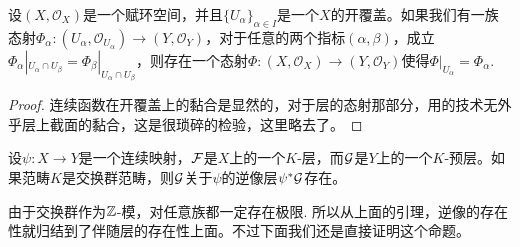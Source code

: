 \begin{pro}
设$(X,\mathcal{O}_X)$是一个赋环空间，并且$\{U_\alpha\}_{\alpha\in I}$是一个$X$的开覆盖。如果我们有一族态射$\Phi_\alpha:(U_{\alpha},\mathcal{O}_{U_{\alpha}})\to (Y,\mathcal{O}_Y)$，对于任意的两个指标$(\alpha,\beta)$，成立$\Phi_\alpha|_{U_{\alpha}\cap U_{\beta}}=\Phi_\beta|_{U_{\alpha}\cap U_{\beta}}$，则存在一个态射$\Phi:(X,\mathcal{O}_{X})\to (Y,\mathcal{O}_Y)$使得$\Phi|_{U_{\alpha}}=\Phi_\alpha$.
\end{pro}

\begin{proof} 连续函数在开覆盖上的黏合是显然的，对于层的态射那部分，用的技术无外乎层上截面的黏合，这是很琐碎的检验，这里略去了。\end{proof}

\begin{pro}\label{proinverse}
设$\psi:X\to Y$是一个连续映射，$\mathcal{F}$是$X$上的一个$K$-层，而$\mathcal{G}$是$Y$上的一个$K$-预层。如果范畴$K$是交换群范畴，则$\mathcal{G}$关于$\psi$的逆像层$\psi^*\mathcal{G}$存在。
\end{pro}

由于交换群作为$\mathbb{Z}$-模，对任意族都一定存在极限. 所以从上面的引理，逆像的存在性就归结到了伴随层的存在性上面。不过下面我们还是直接证明这个命题。

